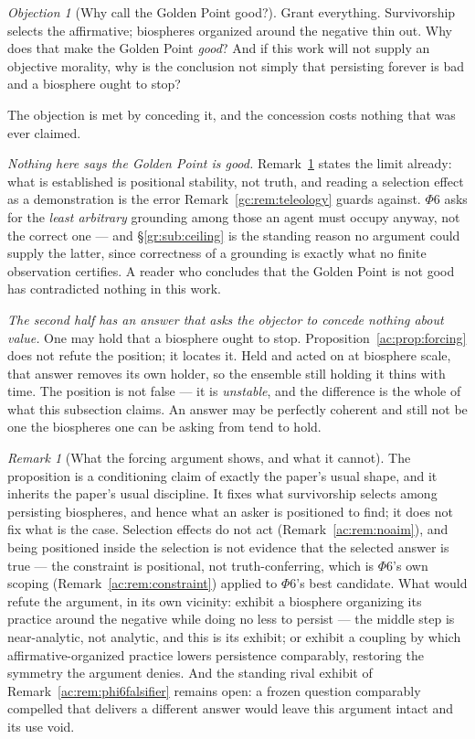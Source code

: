 \documentclass[11pt]{article}
\numberwithin{equation}{section}
\theoremstyle{plain}
\theoremstyle{definition}
\theoremstyle{remark}
\newtheorem{remark}[theorem]{Remark}
\newtheorem{objection}[theorem]{Objection}
\begin{document}
\begin{objection}[Why call the Golden Point good?]\label{ac:obj:good}
Grant everything. Survivorship selects the affirmative; biospheres
organized around the negative thin out. Why does that make the Golden
Point \emph{good}? And if this work will not supply an objective
morality, why is the conclusion not simply that persisting forever is bad
and a biosphere ought to stop?
\end{objection}

\noindent The objection is met by conceding it, and the concession costs
nothing that was ever claimed.

\emph{Nothing here says the Golden Point is good.}
Remark~\ref{ac:rem:forcing} states the limit already: what is
established is positional stability, not truth, and reading a selection
effect as a demonstration is the error Remark~\ref{gc:rem:teleology} guards
against. $\Phi6$ asks for the \emph{least arbitrary} grounding among
those an agent must occupy anyway, not the correct one --- and
\S\ref{gr:sub:ceiling} is the standing reason no argument could supply
the latter, since correctness of a grounding is exactly what no finite
observation certifies. A reader who concludes that the Golden Point is
not good has contradicted nothing in this work.

\emph{The second half has an answer that asks the objector to concede
nothing about value.} One may hold that a biosphere ought to stop.
Proposition~\ref{ac:prop:forcing} does not refute the position; it
locates it. Held and acted on at biosphere scale, that answer removes its
own holder, so the ensemble still holding it thins with time. The
position is not false --- it is \emph{unstable}, and the difference is
the whole of what this subsection claims. An answer may be perfectly
coherent and still not be one the biospheres one can be asking from tend
to hold.

\begin{remark}[What the forcing argument shows, and what it cannot]\label{ac:rem:forcing}
The proposition is a conditioning claim of exactly the paper's usual shape, and it inherits the paper's usual discipline. It fixes what survivorship selects among persisting biospheres, and hence what an asker is positioned to find; it does not fix what is the case. Selection effects do not act (Remark~\ref{ac:rem:noaim}), and being positioned inside the selection is not evidence that the selected answer is true --- the constraint is positional, not truth-conferring, which is $\Phi6$'s own scoping (Remark~\ref{ac:rem:constraint}) applied to $\Phi6$'s best candidate. What would refute the argument, in its own vicinity: exhibit a biosphere organizing its practice around the negative while doing no less to persist --- the middle step is near-analytic, not analytic, and this is its exhibit; or exhibit a coupling by which affirmative-organized practice lowers persistence comparably, restoring the symmetry the argument denies. And the standing rival exhibit of Remark~\ref{ac:rem:phi6falsifier} remains open: a frozen question comparably compelled that delivers a different answer would leave this argument intact and its use void.
\end{remark}
\end{document}
